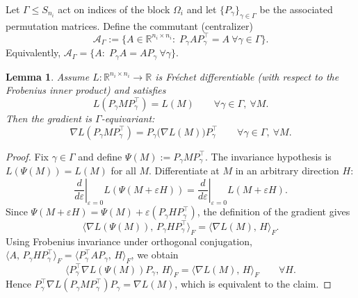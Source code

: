 \documentclass{article}
\theoremstyle{plain}
\newtheorem{lemma}{Lemma}[section]
\numberwithin{equation}{section}
\theoremstyle{definition}
\theoremstyle{remark}
\begin{document}
Let $\Gamma \le S_{n_i}$ act on indices of the block $\Omega_i$ and let
$\{P_\gamma\}_{\gamma\in\Gamma}$ be the associated permutation matrices.
Define the commutant (centralizer)
\[
\mathcal{A}_\Gamma := \{A\in\mathbb{R}^{n_i\times n_i}:\; P_\gamma A P_\gamma^\top = A \ \forall \gamma\in\Gamma\}.
\]
Equivalently, $\mathcal{A}_\Gamma=\{A:\;P_\gamma A = A P_\gamma\ \forall\gamma\}$.

\begin{lemmaproofbox}\label{lem:grad-equivariance}
\begin{lemma}
Assume $L:\mathbb{R}^{n_i\times n_i}\to\mathbb{R}$ is Fr\'echet differentiable
(with respect to the Frobenius inner product) and satisfies
\[
L(P_\gamma M P_\gamma^\top)=L(M)\qquad \forall \gamma\in\Gamma,\ \forall M.
\]
Then the gradient is $\Gamma$-equivariant:
\[
\nabla L(P_\gamma M P_\gamma^\top)=P_\gamma\big(\nabla L(M)\big)P_\gamma^\top
\qquad \forall \gamma\in\Gamma,\ \forall M.
\]
\end{lemma}
\begin{proof}
Fix $\gamma\in\Gamma$ and define $\Psi(M):=P_\gamma M P_\gamma^\top$.
The invariance hypothesis is $L(\Psi(M))=L(M)$ for all $M$.
Differentiate at $M$ in an arbitrary direction $H$:
\[
\left.\frac{d}{d\varepsilon}\right|_{\varepsilon=0} L(\Psi(M+\varepsilon H))
=
\left.\frac{d}{d\varepsilon}\right|_{\varepsilon=0} L(M+\varepsilon H).
\]
Since $\Psi(M+\varepsilon H)=\Psi(M)+\varepsilon(P_\gamma H P_\gamma^\top)$, the definition of the gradient gives
\[
\big\langle \nabla L(\Psi(M)),\, P_\gamma H P_\gamma^\top\big\rangle_F
=
\big\langle \nabla L(M),\, H\big\rangle_F.
\]
Using Frobenius invariance under orthogonal conjugation,
$\langle A,\,P_\gamma H P_\gamma^\top\rangle_F=\langle P_\gamma^\top A P_\gamma,\,H\rangle_F$,
we obtain
\[
\big\langle P_\gamma^\top \nabla L(\Psi(M)) P_\gamma,\,H\big\rangle_F
=
\big\langle \nabla L(M),\,H\big\rangle_F
\qquad\forall H.
\]
Hence $P_\gamma^\top \nabla L(P_\gamma M P_\gamma^\top) P_\gamma=\nabla L(M)$, which is equivalent to the claim.
\end{proof}
\end{lemmaproofbox}
\end{document}
